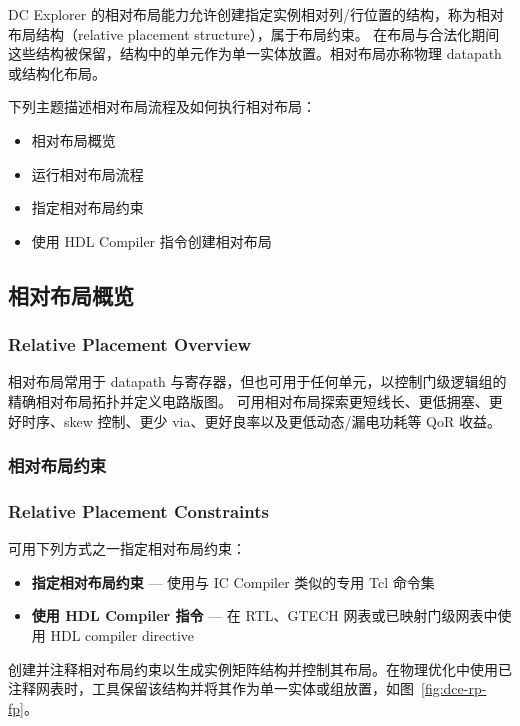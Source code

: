 DC Explorer 的相对布局能力允许创建指定实例相对列/行位置的结构，称为相对布局结构（relative placement structure），属于布局约束。
在布局与合法化期间这些结构被保留，结构中的单元作为单一实体放置。相对布局亦称物理 datapath 或结构化布局。

下列主题描述相对布局流程及如何执行相对布局：
\begin{itemize}
  \item 相对布局概览
  \item 运行相对布局流程
  \item 指定相对布局约束
  \item 使用 HDL Compiler 指令创建相对布局
\end{itemize}

\subsection{相对布局概览}
\subsubsection*{Relative Placement Overview}

相对布局常用于 datapath 与寄存器，但也可用于任何单元，以控制门级逻辑组的精确相对布局拓扑并定义电路版图。
可用相对布局探索更短线长、更低拥塞、更好时序、skew 控制、更少 via、更好良率以及更低动态/漏电功耗等 QoR 收益。

\subsubsection{相对布局约束}
\subsubsection*{Relative Placement Constraints}

可用下列方式之一指定相对布局约束：
\begin{itemize}
  \item \textbf{指定相对布局约束} — 使用与 IC Compiler 类似的专用 Tcl 命令集
  \item \textbf{使用 HDL Compiler 指令} — 在 RTL、GTECH 网表或已映射门级网表中使用 HDL compiler directive
\end{itemize}

创建并注释相对布局约束以生成实例矩阵结构并控制其布局。在物理优化中使用已注释网表时，工具保留该结构并将其作为单一实体或组放置，如图~\ref{fig:dce-rp-fp}。


